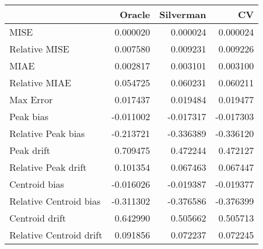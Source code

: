 \begin{tabular}{lrrr}
  \hline
 & Oracle & Silverman & CV \\ 
  \hline
MISE & 0.000020 & 0.000024 & 0.000024 \\ 
  Relative MISE & 0.007580 & 0.009231 & 0.009226 \\ 
  MIAE & 0.002817 & 0.003101 & 0.003100 \\ 
  Relative MIAE & 0.054725 & 0.060231 & 0.060211 \\ 
  Max Error & 0.017437 & 0.019484 & 0.019477 \\ 
  Peak bias & -0.011002 & -0.017317 & -0.017303 \\ 
  Relative Peak bias & -0.213721 & -0.336389 & -0.336120 \\ 
  Peak drift & 0.709475 & 0.472244 & 0.472127 \\ 
  Relative Peak drift & 0.101354 & 0.067463 & 0.067447 \\ 
  Centroid bias & -0.016026 & -0.019387 & -0.019377 \\ 
  Relative Centroid bias & -0.311302 & -0.376586 & -0.376399 \\ 
  Centroid drift & 0.642990 & 0.505662 & 0.505713 \\ 
  Relative Centroid drift & 0.091856 & 0.072237 & 0.072245 \\ 
   \hline
\end{tabular}

